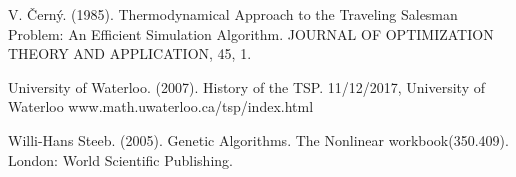 \documentclass[twoside,twocolumn]{article}
\begin{document}
  \begin{thebibliography}{99} %
  
  
  V. Černý. (1985). 
  \newblock Thermodynamical Approach to the Traveling Salesman Problem: An Efficient Simulation Algorithm. 
  \newblock JOURNAL OF OPTIMIZATION THEORY AND APPLICATION, 45, 1.
  
  University of Waterloo. (2007). 
  \newblock History of the TSP. 11/12/2017, University of Waterloo
  \newblock www.math.uwaterloo.ca/tsp/index.html
  
  Willi-Hans Steeb. (2005). 
  \newblock Genetic Algorithms. 
  \newblock The Nonlinear workbook(350.409). London: World Scientific Publishing.
  
  \end{thebibliography}
  
  
  
\end{document}
